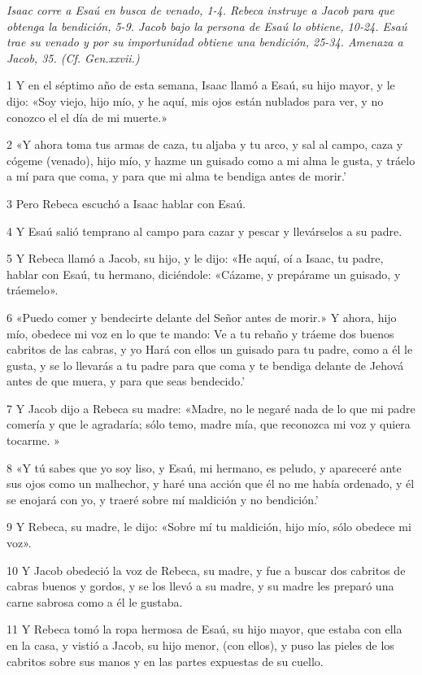 \textit{Isaac corre a Esaú en busca de venado, 1-4. Rebeca instruye a Jacob para que obtenga la bendición, 5-9. Jacob bajo la persona de Esaú lo obtiene, 10-24. Esaú trae su venado y por su importunidad obtiene una bendición, 25-34. Amenaza a Jacob, 35. (Cf. Gen.xxvii.)}

\par 1 Y en el séptimo año de esta semana, Isaac llamó a Esaú, su hijo mayor, y le dijo: «Soy viejo, hijo mío, y he aquí, mis ojos están nublados para ver, y no conozco el el día de mi muerte.»
\par 2 «Y ahora toma tus armas de caza, tu aljaba y tu arco, y sal al campo, caza y cógeme (venado), hijo mío, y hazme un guisado como a mi alma le gusta, y tráelo a mí para que coma, y ​​para que mi alma te bendiga antes de morir.'
\par 3 Pero Rebeca escuchó a Isaac hablar con Esaú.
\par 4 Y Esaú salió temprano al campo para cazar y pescar y llevárselos a su padre.
\par 5 Y Rebeca llamó a Jacob, su hijo, y le dijo: «He aquí, oí a Isaac, tu padre, hablar con Esaú, tu hermano, diciéndole: «Cázame, y prepárame un guisado, y tráemelo».
\par 6 «Puedo comer y bendecirte delante del Señor antes de morir.» Y ahora, hijo mío, obedece mi voz en lo que te mando: Ve a tu rebaño y tráeme dos buenos cabritos de las cabras, y yo Hará con ellos un guisado para tu padre, como a él le gusta, y se lo llevarás a tu padre para que coma y te bendiga delante de Jehová antes de que muera, y para que seas bendecido.'
\par 7 Y Jacob dijo a Rebeca su madre: «Madre, no le negaré nada de lo que mi padre comería y que le agradaría; sólo temo, madre mía, que reconozca mi voz y quiera tocarme. »
\par 8 «Y tú sabes que yo soy liso, y Esaú, mi hermano, es peludo, y apareceré ante sus ojos como un malhechor, y haré una acción que él no me había ordenado, y él se enojará con yo, y traeré sobre mí maldición y no bendición.'
\par 9 Y Rebeca, su madre, le dijo: «Sobre mí tu maldición, hijo mío, sólo obedece mi voz».
\par 10 Y Jacob obedeció la voz de Rebeca, su madre, y fue a buscar dos cabritos de cabras buenos y gordos, y se los llevó a su madre, y su madre les preparó una carne sabrosa como a él le gustaba.
\par 11 Y Rebeca tomó la ropa hermosa de Esaú, su hijo mayor, que estaba con ella en la casa, y vistió a Jacob, su hijo menor, (con ellos), y puso las pieles de los cabritos sobre sus manos y en las partes expuestas de su cuello.
